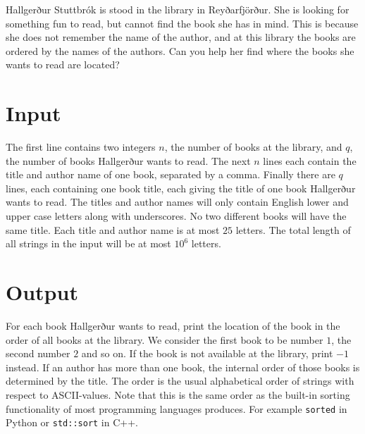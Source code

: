 
Hallgerður Stuttbrók is stood in the library in Reyðarfjörður.
She is looking for something fun to read, but cannot find the book she has in mind.
This is because she does not remember the name of the author, and at this library the books are ordered by the names of the authors.
Can you help her find where the books she wants to read are located?

\section*{Input}
The first line contains two integers $n$, the number of books at the library, and $q$, the number of books Hallgerður wants to read.
The next $n$ lines each contain the title and author name of one book, separated by a comma.
Finally there are $q$ lines, each containing one book title, each giving the title of one book Hallgerður wants to read.
The titles and author names will only contain English lower and upper case letters along with underscores.
No two different books will have the same title.
Each title and author name is at most $25$ letters.
The total length of all strings in the input will be at most $10^6$ letters.

\section*{Output}
For each book Hallgerður wants to read, print the location of the book in the order of all books at the library.
We consider the first book to be number $1$, the second number $2$ and so on.
If the book is not available at the library, print $-1$ instead.
If an author has more than one book, the internal order of those books is determined by the title.
The order is the usual alphabetical order of strings with respect to ASCII-values.
Note that this is the same order as the built-in sorting functionality of most programming languages produces.
For example \texttt{sorted} in Python or \texttt{std::sort} in C++.

